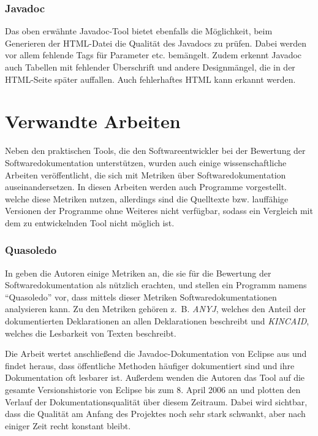 \subsubsection{Javadoc}
Das oben erwähnte Javadoc-Tool bietet ebenfalls die Möglichkeit, beim Generieren der HTML-Datei die Qualität des Javadocs zu prüfen. Dabei werden vor allem fehlende Tags für Parameter etc. bemängelt. Zudem erkennt Javadoc auch Tabellen mit fehlender Überschrift und andere Designmängel, die in der \ac{HTML}-Seite später auffallen. Auch fehlerhaftes \ac{HTML} kann erkannt werden.

\section{Verwandte Arbeiten}

Neben den praktischen Tools, die den Softwareentwickler bei der Bewertung der Softwaredokumentation unterstützen, wurden auch einige wissenschaftliche Arbeiten veröffentlicht, die sich mit Metriken über Softwaredokumentation auseinandersetzen. In diesen Arbeiten werden auch Programme vorgestellt. welche diese Metriken nutzen, allerdings sind die Quelltexte bzw.  lauffähige Versionen der Programme ohne Weiteres nicht verfügbar, sodass ein Vergleich mit dem zu entwickelnden Tool nicht möglich ist. 


\subsubsection{Quasoledo}\label{chapter:Quasoledo}
In \cite[S.~4-10]{HowDocumentationEvolvesoverTime} geben die Autoren einige Metriken an, die sie für die Bewertung der Softwaredokumentation als nützlich erachten, und stellen ein Programm namens \enquote{Quasoledo} vor, dass mittels dieser Metriken Softwaredokumentationen analysieren kann. Zu den Metriken gehören z.~B.  \textit{ANYJ},  welches den Anteil der dokumentierten Deklarationen an allen Deklarationen beschreibt und \textit{KINCAID}, welches die Lesbarkeit von Texten beschreibt.

Die Arbeit wertet anschließend die Javadoc-Dokumentation von Eclipse aus und findet heraus, dass öffentliche Methoden häufiger dokumentiert sind und ihre Dokumentation oft lesbarer ist. Außerdem wenden die Autoren das Tool auf die gesamte Versionshistorie von Eclipse bis zum 8. April 2006 an und plotten den Verlauf der Dokumentationsqualität über diesem Zeitraum. Dabei wird sichtbar, dass die Qualität am Anfang des Projektes noch sehr stark schwankt, aber nach einiger Zeit recht konstant bleibt. 
